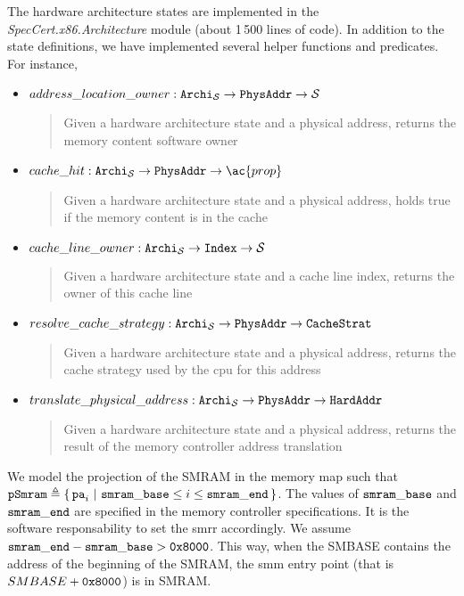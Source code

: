 The hardware architecture states are implemented in the
\emph{SpecCert.x86.Archi\-tecture} module (about 1\,500 lines of code).
%
In addition to the state definitions, we have implemented several helper
functions and predicates.
%
For instance,
%
\begin{itemize}
\item
  $address\_location\_owner : \texttt{Archi}_{\mathcal{S}} \rightarrow
  \texttt{PhysAddr} \rightarrow \mathcal{S}$
  \begin{quote}
    \small Given a hardware architecture state and a physical address, returns
    the memory content software owner
  \end{quote}
%
\item
  $cache\_hit : \texttt{Archi}_{\set{S}} \rightarrow \texttt{PhysAddr}
  \rightarrow \ac{prop}$
  \begin{quote}
    \small Given a hardware architecture state and a physical address, holds
    true if the memory content is in the cache
  \end{quote}
%
\item
  $cache\_line\_owner : \texttt{Archi}_{\mathcal{S}} \rightarrow \texttt{Index}
  \rightarrow \mathcal{S}$
  \begin{quote}
    \small Given a hardware architecture state and a cache line index, returns
    the owner of this cache line
  \end{quote}
%
\item
  $resolve\_cache\_strategy : \texttt{Archi}_{\mathcal{S}} \rightarrow
  \texttt{PhysAddr} \rightarrow \texttt{CacheStrat}$
  \begin{quote}
    \small Given a hardware architecture state and a physical address, returns
    the cache strategy used by the \ac{cpu} for this address
  \end{quote}
%
\item
  $translate\_physical\_address : \texttt{Archi}_{\mathcal{S}} \rightarrow
  \texttt{PhysAddr} \rightarrow \texttt{HardAddr}$
  \begin{quote}
    \small Given a hardware architecture state and a physical address, returns
    the result of the memory controller address translation
  \end{quote}
\end{itemize}

We model the projection of the SMRAM in the memory map such that
$\texttt{pSmram} \triangleq \{\,\mathtt{pa}_i\ |\ \mathtt{smram\_base} \leq i \le
  \mathtt{smram\_end}\,\}$.
%
The values of $\mathtt{smram\_base}$ and $\mathtt{smram\_end}$ are specified in the
memory controller specifications.
%
It is the software responsability to set the \ac{smrr} accordingly.
%
We assume $\mathtt{smram\_end} - \mathtt{smram\_base} > \mathtt{0x8000}$.
%
This way, when the SMBASE contains the address of the beginning of the SMRAM,
the \ac{smm} entry point (that is $SMBASE + \mathtt{0x8000}$) is in SMRAM.

